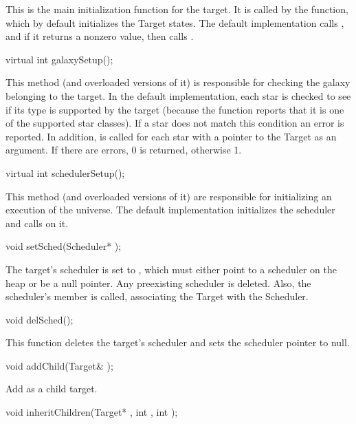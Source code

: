 This is the main initialization function for the target.  It is called
by the  function, which by default initializes the
Target states.  The default implementation calls ,
and if it returns a nonzero value, then calls .

\begin{example}
virtual int galaxySetup();
\end{example}

This method (and overloaded versions of it) is responsible for checking
the galaxy belonging to the target.  In the default implementation,
each star is checked to see if its type is
supported by the target (because the  function reports
that it is one of the supported star classes).  If a star does not
match this condition an error is reported.  In addition,
 is called for each star with a pointer to the Target
as an argument.  If there are errors, 0 is returned, otherwise 1.

\begin{example}
virtual int schedulerSetup();
\end{example}

This method (and overloaded versions of it) are responsible for
initializing an execution of the universe.  The default implementation
initializes the scheduler and calls  on it.

\begin{example}
void setSched(Scheduler* );
\end{example}

The target's scheduler is set to , which must either point to a
scheduler on the heap or be a null pointer.  Any preexisting scheduler
is deleted.  Also, the scheduler's  member is called,
associating the Target with the Scheduler.

\begin{example}
void delSched();
\end{example}

This function deletes the target's scheduler and sets the scheduler
pointer to null.

\begin{example}
void addChild(Target& );
\end{example}

Add  as a child target.

\begin{example}
void inheritChildren(Target* , int , int );
\end{example}

